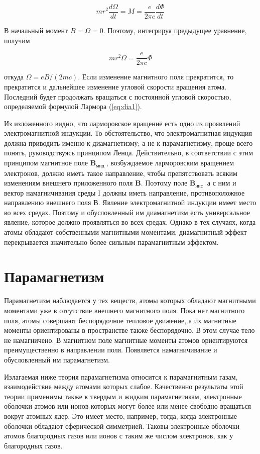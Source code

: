 \documentclass[12pt]{article}
\begin{document}
  \begin{equation}
  m r^2 \frac{d \Omega}{d t}=M=\frac{e}{2 \pi c} \frac{d \Phi}{d t}
  \end{equation}

  В начальный момент $B=\Omega=0$. Поэтому, интегрируя предыдущее уравнение, получим

  \begin{equation}
  m r^2 \Omega=\frac{e}{2 \pi c} \Phi
  \end{equation}

  откуда $\Omega=e B /(2 m c)$. Если изменение магнитного поля прекратится, то прекратится и дальнейшее изменение угловой скорости вращения атома. Последний будет продолжать вращаться с постоянной угловой скоростью, определяемой формулой Лармора (\ref{eq:dia1}).

  Из изложенного видно, что ларморовское вращение есть одно из проявлений электромагнитной индукции. То обстоятельство, что электромагнитная индукция должна приводить именно к диамагнетизму; а не к парамагнетизму, проще всего понять, руководствуясь принципом Ленца. Действительно, в соответствии с этим принципом магнитное поле $\mathbf{B}_{\text {мид }}$, возбуждаемое ларморовским вращением электронов, должно иметь такое направление, чтобы препятствовать всяким изменениям внешнего приложенного поля $\mathbf{B}$. Поэтому поле $\mathbf{B}_{\text {нис }}$ а с ним и вектор намагничивания среды I должны иметь направление, противоположное направлению внешнего поля В. Явление электромагнитной индукции имеет место во всех средах. Поэтому и обусловленный им диамагнетизм есть универсальное явление, которое должно проявляться во всех средах. Однако в тех случаях, когда атомы обладают собственными магнитными моментами, диамагнитный эффект перекрывается значительно более сильным парамагнитным эффектом.

  \section{Парамагнетизм}
  Парамагнетизм наблюдается у тех веществ, атомы которых обладают магнитными моментами уже в отсутствие внешнего магнитного поля. Пока нет магнитного поля, атомы совершают беспорядочное тепловое движение, а их магнитные моменты ориентированы в пространстве также беспорядочно. В этом случае тело не намагничено. В магнитном поле магнитные моменты атомов ориентируются преимущественно в направлении поля. Появляется намагничивание и обусловленный им парамагнетизм.

  Излагаемая ниже теория парамагнетизма относится к парамагнитным газам, взаимодействие между атомами которых слабое. Качественно результаты этой теории применимы также к твердым и жидким парамагнетикам, электронные оболочки атомов или ионов которых могут более или менее свободно вращаться вокруг атомных ядер. Это имеет место, например, тогда, когда электронные оболочки обладают сферической симметрией. Таковы электронные оболочки атомов благородных газов или ионов с таким же числом электронов, как у благородных газов.
\end{document}
